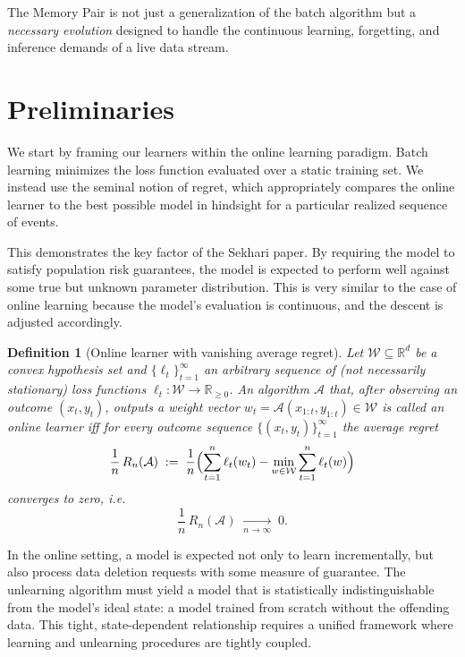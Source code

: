 \documentclass[a4paper,12pt]{article}
\newtheorem{definition}[theorem]{Definition}
\begin{document}
The Memory Pair is not just a generalization of the batch algorithm but a \textit{necessary evolution} designed to handle the continuous learning, forgetting, and inference demands of a live data stream.

\section{Preliminaries}
\label{sec:prelim}

We start by framing our learners within the online learning paradigm. Batch learning  minimizes the loss function evaluated over a static training set. We instead use the seminal notion of regret, which appropriately compares the online learner to the best possible model in hindsight for a particular realized sequence of events.

This demonstrates the key factor of the Sekhari paper. By requiring the model to satisfy population risk guarantees, the model is expected to perform well against some true but unknown parameter distribution. This is very similar to the case of online learning because the model's evaluation is continuous, and the descent is adjusted accordingly.

\begin{definition}[Online learner with vanishing average regret]
\label{def:online-learner}
Let $\mathcal W \subseteq \mathbb{R}^d$ be a convex hypothesis set and $\{\ell_t\}_{t=1}^\infty$ an arbitrary sequence of (not necessarily stationary) loss functions $\ell_t : \mathcal W \to \mathbb{R}_{\ge 0}$. An algorithm $\mathcal A$ that, after observing an outcome $(x_t,y_t)$, outputs a weight vector $w_t = \mathcal A(x_{1:t},y_{1:t}) \in \mathcal W$ is called an \emph{online learner} iff for every outcome sequence $\{(x_t,y_t)\}_{t=1}^\infty$ the \emph{average regret}
\[
  \frac{1}{n}\,R_n(\mathcal A)
  \;:=\;
  \frac{1}{n}
  \Bigl(
    \sum_{t=1}^{n}\ell_t(w_t)
    -
    \min_{w\in\mathcal W}\sum_{t=1}^{n}\ell_t(w)
  \Bigr)
\]
converges to zero,
i.e.
\[
  \frac{1}{n}\,R_n(\mathcal A)
  \;\xrightarrow[n\to\infty]{}\;0.
\]
\end{definition}

In the online setting, a model is expected not only to learn incrementally, but also process data deletion requests with some measure of guarantee. The unlearning algorithm must yield a model that is statistically indistinguishable from the model's ideal state: a model trained from scratch without the offending data. This tight, state-dependent relationship requires a unified framework where learning and unlearning procedures are tightly coupled.
\end{document}
